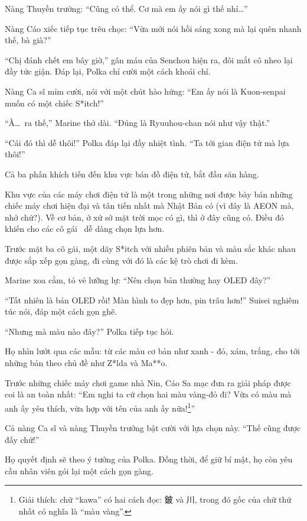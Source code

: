 \documentclass[../main.tex]{subfiles}
\begin{document}
Nàng Thuyền trưởng: ``Cũng có thể. Cơ mà em ấy nói gì thế nhỉ\dots''

Nàng Cáo xiếc tiếp tục trêu chọc: ``Vừa mới nói hồi sáng xong mà lại quên nhanh thế, bà già?''

``Chị đánh chết em bây giờ,'' gân máu của Senchou hiện ra, đôi mắt cô nheo lại đầy tức giận. Đáp lại, Polka chỉ cười một cách khoái chí.

Nàng Ca sĩ mỉm cười, nói với một chút hào hứng: ``Em ấy nói là Kuon-senpai muốn có một chiếc S*itch!''

``À\dots\ ra thế,'' Marine thở dài. ``Đúng là Ryuuhou-chan nói như vậy thật.''

``Cái đó thì dễ thôi!'' Polka đáp lại đầy nhiệt tình. ``Ta tới gian điện tử mà lựa thôi!''

Cả ba phấn khích tiến đến khu vực bán đồ điện tử, bắt đầu săn hàng.

\ct

Khu vực của các máy chơi điện tử là một trong những nơi được bày bán những chiếc máy chơi hiện đại và tân tiến nhất mà Nhật Bản có (vì đây là AEON mà, nhớ chứ?). Về cơ bản, ở xứ sở mặt trời mọc có gì, thì ở đây cũng có. Điều đó khiến cho các cô gái \hll\ dễ dàng chọn lựa hơn.

Trước mặt ba cô gái, một dãy S*itch với nhiều phiên bản và màu sắc khác nhau được sắp xếp gọn gàng, đi cùng với đó là các kệ trò chơi đi kèm.

Marine xoa cằm, tỏ vẻ lưỡng lự: ``Nên chọn bản thường hay OLED đây?''

``Tất nhiên là bản OLED rồi! Màn hình to đẹp hơn, pin trâu hơn!'' Suisei nghiêm túc nói, đáp một cách gọn ghẽ.

``Nhưng mà màu nào đây?'' Polka tiếp tục hỏi.

Họ nhìn lướt qua các mẫu: từ các màu cơ bản như xanh - đỏ, xám, trắng, cho tới những bản theo chủ đề như Z*lda và Ma**o.

Trước những chiếc máy chơi game nhà Nin, Cáo Sa mạc đưa ra giải pháp được coi là an toàn nhất: ``Em nghi ta cứ chọn hai màu vàng-đỏ đi? Vừa có màu mà anh ấy yêu thích, vừa hợp với tên của anh ấy nữa!\footnote{Giải thích: chữ ``kawa'' có hai cách đọc: 鈹 và 川, trong đó gốc  của chữ thứ nhất có nghĩa là ``màu vàng''.}''

Cả nàng Ca sĩ và nàng Thuyền trưởng bật cười với lựa chọn này. ``Thế cũng được đấy chứ!''

Họ quyết định sẽ theo ý tưởng của Polka. Đồng thời, để giữ bí mật, họ còn yêu cầu nhân viên gói lại một cách gọn gàng.
\end{document}
